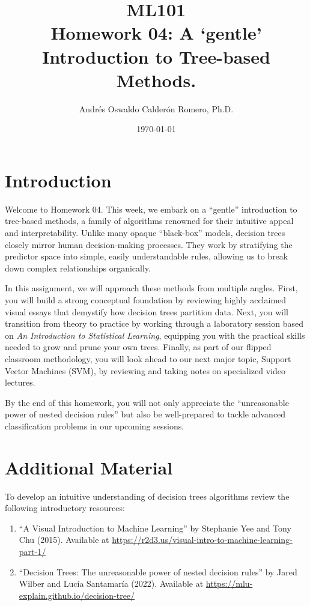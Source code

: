 \documentclass{article}
\title{ML101 \\ Homework 04: A `gentle' Introduction to Tree-based Methods.}
\author{Andrés Oswaldo Calderón Romero, Ph.D.}
\date{\today}
\begin{document}
\maketitle

\section{Introduction}
\label{sec:intro}

Welcome to Homework 04. This week, we embark on a ``gentle'' introduction to tree-based methods, a family of algorithms renowned for their intuitive appeal and interpretability. Unlike many opaque ``black-box'' models, decision trees closely mirror human decision-making processes. They work by stratifying the predictor space into simple, easily understandable rules, allowing us to break down complex relationships organically.

In this assignment, we will approach these methods from multiple angles. First, you will build a strong conceptual foundation by reviewing highly acclaimed visual essays that demystify how decision trees partition data. Next, you will transition from theory to practice by working through a laboratory session based on \textit{An Introduction to Statistical Learning}, equipping you with the practical skills needed to grow and prune your own trees. Finally, as part of our flipped classroom methodology, you will look ahead to our next major topic, Support Vector Machines (SVM), by reviewing and taking notes on specialized video lectures.

By the end of this homework, you will not only appreciate the ``unreasonable power of nested decision rules'' but also be well-prepared to tackle advanced classification problems in our upcoming sessions.

\section{Additional Material}
\label{sec:reading}

To develop an intuitive understanding of decision trees algorithms review the following introductory resources:

\begin{enumerate}
  \item ``A Visual Introduction to Machine Learning'' by Stephanie Yee and Tony Chu (2015).  Available at \url{https://r2d3.us/visual-intro-to-machine-learning-part-1/}
  \item ``Decision Trees: The unreasonable power of nested decision rules'' by Jared Wilber and Lucía Santamaría (2022).  Available at \url{https://mlu-explain.github.io/decision-tree/}
\end{enumerate}
\end{document}
